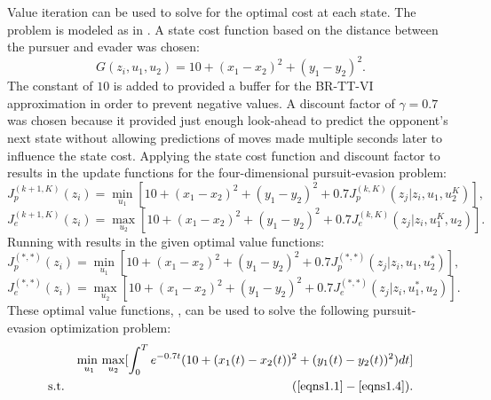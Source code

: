 Value iteration can be used to solve for the optimal cost at each state. The problem is modeled as in . A state cost function based on the distance between the pursuer and evader was chosen: 
\begin{equation}\label{4cost}
G(z_i,u_1,u_2)= 10+(x_1-x_2)^2+(y_1-y_2)^2.
\end{equation}
The constant of $10$ is added to provided a buffer for the BR-TT-VI approximation in order to prevent negative values. A discount factor of $\gamma = 0.7$ was chosen because it provided just enough look-ahead to predict the opponent's next state without allowing predictions of moves made multiple seconds later to influence the state cost. Applying the state cost function and discount factor to  results in the update functions for the four-dimensional pursuit-evasion problem:
\begin{equation}\label{4pbell}
J_p^{(k+1,K)}(z_i)= \underset{u_1 }{\operatorname{min }}[10+(x_1-x_2)^2+(y_1-y_2)^2+0.7 J_p^{(k,K)}(z_j|z_i,u_1,u_2^K)],
\end{equation}
\begin{equation}\label{4ebell}
J_e^{(k+1,K)}(z_i)= \underset{u_2 }{\operatorname{max }}[10+(x_1-x_2)^2+(y_1-y_2)^2+0.7 J_e^{(k,K)}(z_j|z_i,u_1^K,u_2)].
\end{equation} 
Running  with  results in the given optimal value functions:
\begin{equation}\label{4pbropt}
J_p^{(*,*)}(z_i)= \underset{u_1 }{\operatorname{min }}[10+(x_1-x_2)^2+(y_1-y_2)^2+0.7 J_p^{(*,*)}(z_j|z_i,u_1,u_2^*)],
\end{equation}
\begin{equation}\label{4ebropt}
J_e^{(*,*)}(z_i)= \underset{u_2 }{\operatorname{max }}[10+(x_1-x_2)^2+(y_1-y_2)^2+0.7 J_e^{(*,*)}(z_j|z_i,u_1^*,u_2)].
\end{equation}    
These optimal value functions, , can be used to solve the following pursuit-evasion optimization problem:
\begin{eqnarray}\label{4opt}
&&\underset{u_1 }{\operatorname{min \textnormal{ } }}\underset{u_2 }{\operatorname{max }}[\int_{0}^{T}e^{-0.7t}(10+(x_1(t)-x_2(t))^2+(y_1(t)-y_2(t))^2)dt]\\
&\textnormal{s.t.}&(\ref{eqns1.1}-\ref{eqns1.4}).
\end{eqnarray}

